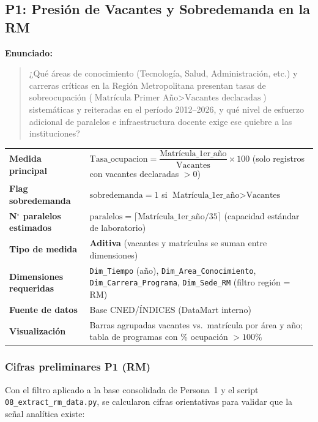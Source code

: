 \documentclass[11pt,a4paper]{article}
\begin{document}
\subsection{P1: Presión de Vacantes y Sobredemanda en la RM}
\label{sec:p1}

\textbf{Enunciado:}
\begin{quote}
¿Qué áreas de conocimiento (Tecnología, Salud, Administración, etc.) y carreras
críticas en la Región Metropolitana presentan tasas de sobreocupación
($\text{Matrícula Primer Año} > \text{Vacantes declaradas}$) sistemáticas y
reiteradas en el período 2012--2026, y qué nivel de esfuerzo adicional de
paralelos e infraestructura docente exige ese quiebre a las instituciones?
\end{quote}

\begin{center}
\small
\begin{tabularx}{\textwidth}{@{}>{\bfseries}p{4.2cm}Y@{}}
\toprule
Medida principal &
  $\text{Tasa\_ocupacion} = \dfrac{\text{Matrícula\_1er\_año}}{\text{Vacantes}}
  \times 100$
  (solo registros con vacantes declaradas $> 0$) \\[4pt]
Flag sobredemanda &
  $\text{sobredemanda} = 1$ si $\text{Matrícula\_1er\_año} > \text{Vacantes}$ \\
N$^{\circ}$ paralelos estimados &
  $\text{paralelos} = \lceil \text{Matrícula\_1er\_año} / 35 \rceil$
  (capacidad estándar de laboratorio) \\
Tipo de medida &
  \textbf{Aditiva} (vacantes y matrículas se suman entre dimensiones) \\
Dimensiones requeridas &
  \texttt{Dim\_Tiempo} (año),
  \texttt{Dim\_Area\_Conocimiento},
  \texttt{Dim\_Carrera\_Programa},
  \texttt{Dim\_Sede\_RM} (filtro región = RM) \\
Fuente de datos &
  Base CNED/ÍNDICES (DataMart interno) \\
Visualización &
  Barras agrupadas vacantes vs.\ matrícula por área y año;
  tabla de programas con \% ocupación $> 100\%$ \\
\bottomrule
\end{tabularx}
\end{center}

\subsubsection{Cifras preliminares P1 (RM)}

Con el filtro aplicado a la base consolidada de Persona~1 y el script
\texttt{08\_extract\_rm\_data.py}, se calcularon cifras orientativas para
validar que la señal analítica existe:
\end{document}
